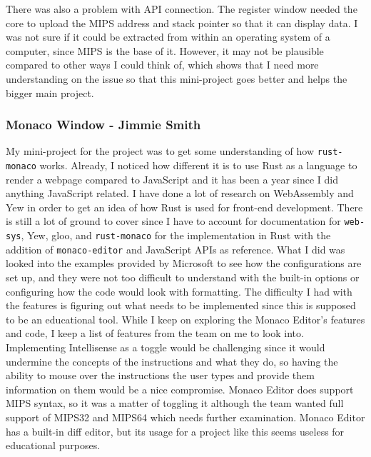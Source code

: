 \documentclass[
    paper=letter,
    parskip=half,
    fontsize=12pt,
    titlepage=firstiscover,
    toc=bibliography,
    numbers=endperiod
]{scrartcl}
\begin{document}
There was also a problem with API connection. The register window needed
the core to upload the MIPS address and stack pointer so that it can
display data. I was not sure if it could be extracted from within an
operating system of a computer, since MIPS is the base of it. However,
it may not be plausible compared to other ways I could think of, which
shows that I need more understanding on the issue so that this
mini-project goes better and helps the bigger main project.

\subsubsection{Monaco Window - Jimmie Smith}

My mini-project for the project was to get some understanding of how
\texttt{rust-monaco} works. Already, I noticed how different it is to
use Rust as a language to render a webpage compared to JavaScript and it
has been a year since I did anything JavaScript related. I have done a
lot of research on WebAssembly and Yew in order to get an idea of how
Rust is used for front-end development. There is still a lot of ground
to cover since I have to account for documentation for \texttt{web-sys},
Yew, gloo, and \texttt{rust-monaco} for the implementation in Rust with
the addition of \texttt{monaco-editor} and JavaScript APIs as reference.
What I did was looked into the examples provided by Microsoft to see how
the configurations are set up, and they were not too difficult to
understand with the built-in options or configuring how the code would
look with formatting. The difficulty I had with the features is figuring
out what needs to be implemented since this is supposed to be an
educational tool. While I keep on exploring the Monaco Editor's features
and code, I keep a list of features from the team on me to look into.
Implementing Intellisense as a toggle would be challenging since it
would undermine the concepts of the instructions and what they do, so
having the ability to mouse over the instructions the user types and
provide them information on them would be a nice compromise. Monaco
Editor does support MIPS syntax, so it was a matter of toggling it
although the team wanted full support of MIPS32 and MIPS64 which needs
further examination. Monaco Editor has a built-in diff editor, but its
usage for a project like this seems useless for educational purposes.
\end{document}
